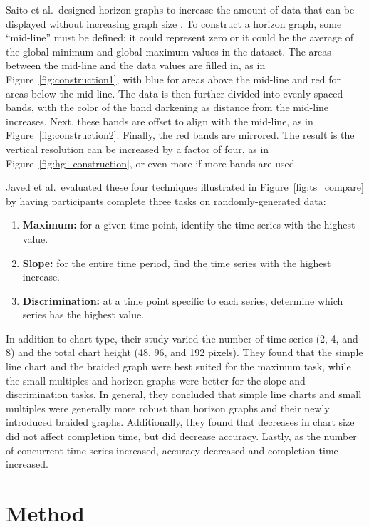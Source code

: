 \documentclass{article}
\begin{document}
Saito et al.\ designed horizon graphs to increase the amount of data that can be displayed without increasing graph size \cite{saito2005}.  To construct a horizon graph, some ``mid-line'' must be defined; it could represent zero or it could be the average of the global minimum and global maximum values in the dataset.  The areas between the mid-line and the data values are filled in, as in Figure~\ref{fig:construction1}, with blue for areas above the mid-line and red for areas below the mid-line.  The data is then further divided into evenly spaced bands, with the color of the band darkening as distance from the mid-line increases.  Next, these bands are offset to align with the mid-line, as in Figure~\ref{fig:construction2}.  Finally, the red bands are mirrored.  The result is the vertical resolution can be increased by a factor of four, as in Figure~\ref{fig:hg_construction}, or even more if more bands are used.

Javed et al.\ evaluated these four techniques illustrated in Figure~\ref{fig:ts_compare} by having participants complete three tasks on randomly-generated data:
\begin{enumerate}
	\item \textbf{Maximum:} for a given time point, identify the time series with the highest value.
	\item \textbf{Slope:} for the entire time period, find the time series with the highest increase.
	\item \textbf{Discrimination:} at a time point specific to each series, determine which series has the highest value.
\end{enumerate}
In addition to chart type, their study varied the number of time series (2, 4, and 8) and the total chart height (48, 96, and 192 pixels).  They found that the simple line chart and the braided graph were best suited for the maximum task, while the small multiples and horizon graphs were better for the slope and discrimination tasks.  In general, they concluded that simple line charts and small multiples were generally more robust than horizon graphs and their newly introduced braided graphs. Additionally, they found that decreases in chart size did not affect completion time, but did decrease accuracy.  Lastly, as the number of concurrent time series increased, accuracy decreased and completion time increased. 

\section{Method}
\end{document}
